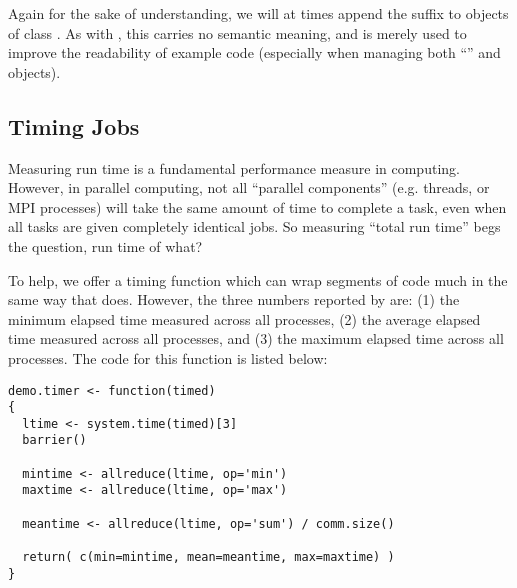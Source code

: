 Again for the sake of understanding, we will at times append the suffix  to objects of class .  As with , this carries no semantic meaning, and is merely used to improve the readability of example code (especially when managing both ``'' and  objects).


\subsection{Timing Jobs}

Measuring run time is a fundamental performance measure in computing.  However, in parallel computing, not all ``parallel components'' (e.g. threads, or MPI processes) will take the same amount of time to complete a task, even when all tasks are given completely identical jobs.  So measuring ``total run time'' begs the question, run time of what?

To help, we offer a timing function  which can wrap segments of code much in the same way that  does.  However, the three numbers reported by  are: (1) the minimum elapsed time measured across all processes, (2) the average elapsed time measured across all processes, and (3) the maximum elapsed time across all processes.  The code for this function is listed below:

\begin{lstlisting}[language=rr,title=Timer Function]
demo.timer <- function(timed)
{
  ltime <- system.time(timed)[3]
  barrier()
  
  mintime <- allreduce(ltime, op='min')
  maxtime <- allreduce(ltime, op='max')
  
  meantime <- allreduce(ltime, op='sum') / comm.size()
  
  return( c(min=mintime, mean=meantime, max=maxtime) )
}
\end{lstlisting}

